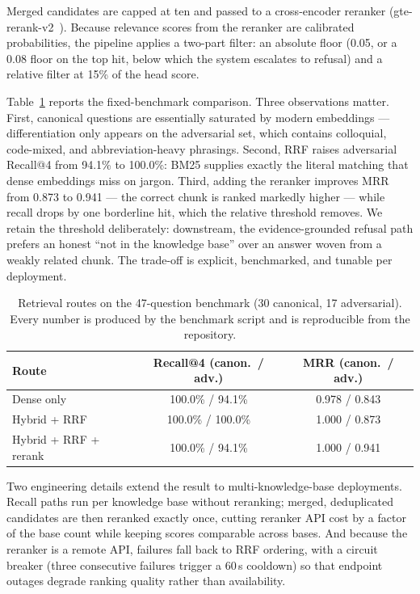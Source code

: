 \documentclass[11pt,a4paper]{article}
\begin{document}
Merged candidates are capped at ten and passed to a cross-encoder reranker
(gte-rerank-v2~\citep{gte2023}). Because relevance scores from the reranker are
calibrated probabilities, the pipeline applies a two-part filter: an absolute floor
(0.05, or a 0.08 floor on the top hit, below which the system escalates to refusal) and
a relative filter at 15\% of the head score.

Table~\ref{tab:routes} reports the fixed-benchmark comparison. Three observations
matter. First, canonical questions are essentially saturated by modern embeddings ---
differentiation only appears on the adversarial set, which contains colloquial,
code-mixed, and abbreviation-heavy phrasings. Second, RRF raises adversarial Recall@4
from 94.1\% to 100.0\%: BM25 supplies exactly the literal matching that dense
embeddings miss on jargon. Third, adding the reranker improves MRR from 0.873 to
0.941 --- the correct chunk is ranked markedly higher --- while recall drops by one
borderline hit, which the relative threshold removes. We retain the threshold
deliberately: downstream, the evidence-grounded refusal path prefers an honest ``not in
the knowledge base'' over an answer woven from a weakly related chunk. The trade-off is
explicit, benchmarked, and tunable per deployment.

\begin{table}[t]
  \centering
  \caption{Retrieval routes on the 47-question benchmark (30 canonical, 17
  adversarial). Every number is produced by the benchmark script and is reproducible
  from the repository.}
  \label{tab:routes}
  \begin{tabular}{lcc}
    \toprule
    Route & Recall@4 (canon.\ / adv.) & MRR (canon.\ / adv.) \\
    \midrule
    Dense only              & 100.0\% / 94.1\%  & 0.978 / 0.843 \\
    Hybrid + RRF            & 100.0\% / 100.0\% & 1.000 / 0.873 \\
    Hybrid + RRF + rerank   & 100.0\% / 94.1\%  & 1.000 / 0.941 \\
    \bottomrule
  \end{tabular}
\end{table}

Two engineering details extend the result to multi-knowledge-base deployments. Recall
paths run per knowledge base without reranking; merged, deduplicated candidates are
then reranked exactly once, cutting reranker API cost by a factor of the base count
while keeping scores comparable across bases. And because the reranker is a remote API,
failures fall back to RRF ordering, with a circuit breaker (three consecutive failures
trigger a 60\,s cooldown) so that endpoint outages degrade ranking quality rather than
availability.
\end{document}
